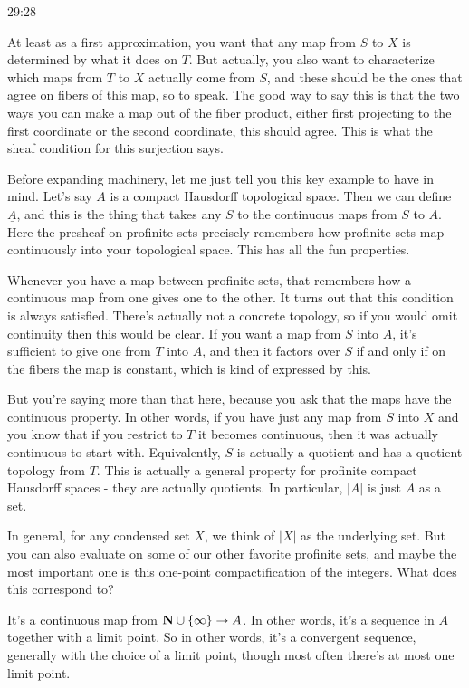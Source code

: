 \begin{example}
\begin{unfinished}{29:28}
\begin{remark}
At least as a first approximation, you want that any map from $S$ to $X$ is determined by what it does on $T$. But actually, you also want to characterize which maps from $T$ to $X$ actually come from $S$, and these should be the ones that agree on fibers of this map, so to speak. The good way to say this is that the two ways you can make a map out of the fiber product, either first projecting to the first coordinate or the second coordinate, this should agree. This is what the sheaf condition for this surjection says.

Before expanding machinery, let me just tell you this key example to have in mind. Let's say $A$ is a compact Hausdorff topological space. Then we can define $\underline{A}$, and this is the thing that takes any $S$ to the continuous maps from $S$ to $A$. Here the presheaf on profinite sets precisely remembers how profinite sets map continuously into your topological space. This has all the fun properties.

Whenever you have a map between profinite sets, that remembers how a continuous map from one gives one to the other. It turns out that this condition is always satisfied. There's actually not a concrete topology, so if you would omit continuity then this would be clear. If you want a map from $S$ into $A$, it's sufficient to give one from $T$ into $A$, and then it factors over $S$ if and only if on the fibers the map is constant, which is kind of expressed by this.

But you're saying more than that here, because you ask that the maps have the continuous property. In other words, if you have just any map from $S$ into $X$ and you know that if you restrict to $T$ it becomes continuous, then it was actually continuous to start with. Equivalently, $S$ is actually a quotient and has a quotient topology from $T$. This is actually a general property for profinite compact Hausdorff spaces - they are actually quotients. In particular, $|A|$ is just $A$ as a set.

In general, for any condensed set $X$, we think of $|X|$ as the underlying set. But you can also evaluate on some of our other favorite profinite sets, and maybe the most important one is this one-point compactification of the integers. What does this correspond to?

It's a continuous map from $\mathbf N \cup \{\infty\} \to A$. In other words, it's a sequence in $A$ together with a limit point. So in other words, it's a convergent sequence, generally with the choice of a limit point, though most often there's at most one limit point. 


\end{remark}
\end{unfinished}
\end{example}
